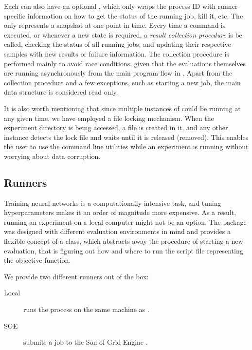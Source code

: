 Each  can also have an optional , which only wraps the process ID with runner-specific information on how to get the status of the running job, kill it, etc. The  only represents a snapshot at one point in time. Every time a \bopt command is executed, or whenever a new state is required, a \emph{result collection procedure} is be called, checking the status of all running jobs, and updating their respective samples with new results or failure information. The collection procedure is performed mainly to avoid race conditions, given that the evaluations themselves are running asynchronously from the main program flow in \bopt. Apart from the collection procedure and a few exceptions, such as starting a new job, the main data structure is considered read only.

It is also worth mentioning that since multiple instances of \bopt could be running at any given time, we have employed a file locking mechanism. When the experiment directory is being accessed, a  file is created in it, and any other \bopt instance detects the lock file and waits until it is released (removed). This enables the user to use the command line utilities while an experiment is running without worrying about data corruption.

\subsection{Runners}
\label{section:runners}

Training neural networks is a computationally intensive task, and tuning hyperparameters makes it an order of magnitude more expensive. As a result, running an experiment on a local computer might not be an option. The package was designed with different evaluation environments in mind and provides a flexible concept of a  class, which abstracts away the procedure of starting a new evaluation, that is figuring out how and where to run the script file representing the objective function.

We provide two different runners out of the box:

\begin{description}
    \item[Local] runs the process on the same machine as \bopt.
    \item[SGE] submits a job to the Son of Grid Engine \citep{sge}.
\end{description}

